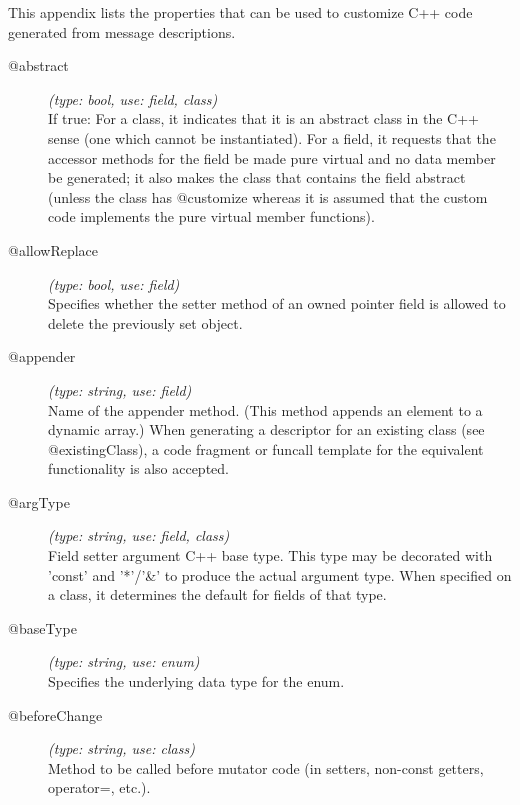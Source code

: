 \label{cha:msg-properties}

This appendix lists the properties that can be used to customize C++ code
generated from message descriptions.

%
%

\begin{description}
\item[@abstract] \textit{(type: bool, use: field, class)} \\
  If true: For a class, it indicates that it is an abstract class in the C++
  sense (one which cannot be instantiated). For a field, it requests that the
  accessor methods for the field be made pure virtual and no data member be
  generated; it also makes the class that contains the field abstract (unless
  the class has @customize whereas it is assumed that the custom code
  implements the pure virtual member functions).

\item[@allowReplace] \textit{(type: bool, use: field)} \\
  Specifies whether the setter method of an owned pointer field is allowed to
  delete the previously set object.

\item[@appender] \textit{(type: string, use: field)} \\
  Name of the appender method. (This method appends an element to a dynamic
  array.) When generating a descriptor for an existing class (see
  @existingClass), a code fragment or funcall template for the equivalent
  functionality is also accepted.

\item[@argType] \textit{(type: string, use: field, class)} \\
  Field setter argument C++ base type. This type may be decorated with 'const'
  and '*'/'\&' to produce the actual argument type. When specified on a class,
  it determines the default for fields of that type.

\item[@baseType] \textit{(type: string, use: enum)} \\
  Specifies the underlying data type for the enum.

\item[@beforeChange] \textit{(type: string, use: class)} \\
  Method to be called before mutator code (in setters, non-const getters,
  operator=, etc.).


\end{description}
